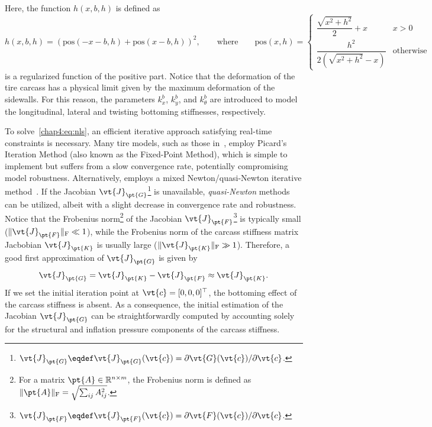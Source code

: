 %
Here, the function $h(x,b,h)$ is defined as
%
\begin{equation}
  h(x,b,h) = \left(\mathrm{pos}(-x-b, h) + \mathrm{pos}(x-b, h)\right)^2,
  \qquad \text{where} \qquad
  \mathrm{pos}(x,h) =
  \begin{cases}
    \dfrac{\sqrt{x^2 + h^2}}{2}+x    & x>0 \\[0.5em]
    \dfrac{h^2}{2(\sqrt{x^2+h^2}-x)} & \mathrm{otherwise}
  \end{cases}
\end{equation}
%
is a regularized function of the positive part. Notice that the deformation of the tire carcass has a physical limit given by the maximum deformation of the sidewalls. For this reason, the parameters $k_x^b$, $k_y^b$, and $k_\theta^b$ are introduced to model the longitudinal, lateral and twisting bottoming stiffnesses, respectively.

To solve~\eqref{chap4:eq:nls}, an efficient iterative approach satisfying real-time constraints is necessary. Many tire models, such as those in~\cite{gruber2012normalI, gruber2012normalII, miyashita2010tire, miyashita2003analytical, miyashita2006new, kabe2006new, miyashita2015study}, employ Picard's Iteration Method (also known as the Fixed-Point Method), which is simple to implement but suffers from a slow convergence rate, potentially compromising model robustness. Alternatively, \TaMeTire{} employs a mixed Newton/quasi-Newton iterative method~\cite{fevrier2013method}. If the Jacobian $\vt{J}_\pt{G}$\footnote{$\vt{J}_\pt{G} \eqdef \vt{J}_\pt{G}(\vt{c}) = \partial\vt{G}(\vt{c})/\partial\vt{c}$.} is unavailable, \emph{quasi-Newton} methods can be utilized, albeit with a slight decrease in convergence rate and robustness. Notice that the Frobenius norm\footnote{For a matrix $\pt{A}\in\mathbb{R}^{n \times m}$, the Frobenius norm is defined as $\|\pt{A}\|_\mathrm{F}=\sqrt{\sum_{ij}A_{ij}^2}$.} of the Jacobian $\vt{J}_\pt{F}$\footnote{$\vt{J}_\pt{F} \eqdef \vt{J}_\pt{F}(\vt{c}) = \partial\vt{F}(\vt{c})/\partial\vt{c}$.} is typically small ($\|\vt{J}_\pt{F}\|_\mathrm{F} \ll 1$), while the Frobenius norm of the carcass stiffness matrix Jacbobian $\vt{J}_\pt{K}$ is usually large ($\|\vt{J}_\pt{K}\|_\mathrm{F} \gg 1$). Therefore, a good first approximation of $\vt{J}_\pt{G}$ is given by
%
\begin{equation}
  \vt{J}_\pt{G} = \vt{J}_\pt{K} - \vt{J}_\pt{F} \approx \vt{J}_\pt{K}.
  \label{chap4:eq:jacobian_approx}
\end{equation}
%
If we set the initial iteration point at $\vt{c} = [0,0,0]^\top$, the bottoming effect of the carcass stiffness is absent. As a consequence, the initial estimation of the Jacobian $\vt{J}_\pt{G}$ can be straightforwardly computed by accounting solely for the structural and inflation pressure components of the carcass stiffness.

